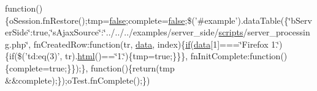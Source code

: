 \begin{DoxyCompactItemize}
function()\{o\+Session.\+fn\+Restore();tmp=\hyperlink{validate_8js_a5df37b7f02e5cdc7d9412b7f872b8e01}{false};complete=\hyperlink{validate_8js_a5df37b7f02e5cdc7d9412b7f872b8e01}{false};\$('\#example').data\+Table(\{\char`\"{}b\+Server\+Side\char`\"{}\+:true,\char`\"{}s\+Ajax\+Source\char`\"{}\+:\char`\"{}../../../examples/server\+\_\+side/\hyperlink{tinymce_8jquery_8dev_8js_a09066d4d580eeec222f858d588b4cdef}{scripts}/server\+\_\+processing.\+php\char`\"{}, fn\+Created\+Row\+:function(tr, \hyperlink{fullpage_2plugin_8js_a718c1bf5a3bf21ebb980203b142e5b75}{data}, index)\{\hyperlink{fullpage_2plugin_8js_a8b98017e64ef036adb9ae327ff94abe1}{if}(\hyperlink{fullpage_2plugin_8js_a718c1bf5a3bf21ebb980203b142e5b75}{data}\mbox{[}1\mbox{]}===\char`\"{}Firefox 1.\char`\"{})\{if(\$('td\+:eq(3)', tr).\hyperlink{tinymce_8jquery_8dev_8js_ac2090bcf2ff968c0083d5de53a6544f3}{html}()==\char`\"{}1.\char`\"{})\{tmp=true;\}\}\}, fn\+Init\+Complete\+:function()\{complete=true;\}\});\}, function()\{return(tmp \&\&complete);\});o\+Test.\+fn\+Complete();\})
\end{DoxyCompactItemize}


